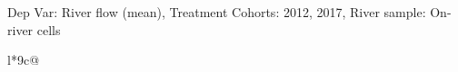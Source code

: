 \begin{table}[H]
\captionlistentry[table]{}
\label{table:beaver_hydrometry_DVflow_mean_SCg12}
\tiny %
Dep Var: River flow (mean), Treatment Cohorts: 2012, 2017, River sample: On-river cells \\
\begin{threeparttable}
\begin{tabulary}{\textwidth}{l*{9}{c}@{}}
\toprule \toprule
\noalign{\smallskip}
\noalign{\smallskip}
\midrule \bottomrule
\end{tabulary}
\medskip
\end{threeparttable}
\end{table}
